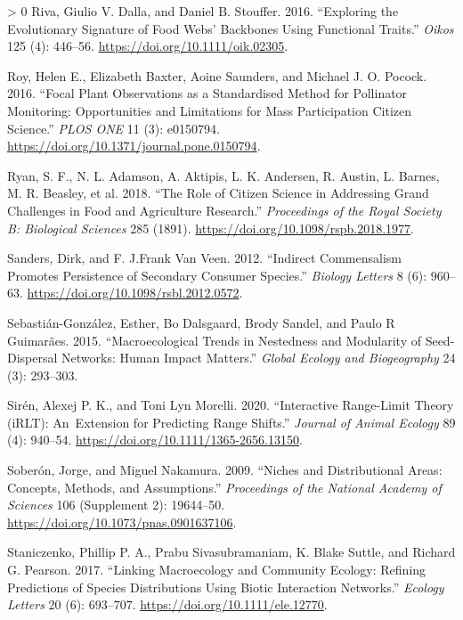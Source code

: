 \documentclass[12pt]{article}
\newlength{\cslhangindent}
\newenvironment{CSLReferences}[3] %
 {%
  \setlength{\parindent}{0pt}
  \ifodd #1 \everypar{\setlength{\hangindent}{\cslhangindent}}\ignorespaces\fi
  \ifnum #2 > 0
  \setlength{\parskip}{#2\baselineskip}
  \fi
 }%
 {}
\begin{document}
\begin{CSLReferences}{1}{0}
\leavevmode\hypertarget{ref-Riva2016ExpEvo}{}%
Riva, Giulio V. Dalla, and Daniel B. Stouffer. 2016. {``Exploring the
Evolutionary Signature of Food Webs' Backbones Using Functional
Traits.''} \emph{Oikos} 125 (4): 446--56.
\url{https://doi.org/10.1111/oik.02305}.

\leavevmode\hypertarget{ref-Roy2016FocPla}{}%
Roy, Helen E., Elizabeth Baxter, Aoine Saunders, and Michael J. O.
Pocock. 2016. {``Focal Plant Observations as a Standardised Method for
Pollinator Monitoring: Opportunities and Limitations for Mass
Participation Citizen Science.''} \emph{PLOS ONE} 11 (3): e0150794.
\url{https://doi.org/10.1371/journal.pone.0150794}.

\leavevmode\hypertarget{ref-Ryan2018RolCit}{}%
Ryan, S. F., N. L. Adamson, A. Aktipis, L. K. Andersen, R. Austin, L.
Barnes, M. R. Beasley, et al. 2018. {``The Role of Citizen Science in
Addressing Grand Challenges in Food and Agriculture Research.''}
\emph{Proceedings of the Royal Society B: Biological Sciences} 285
(1891). \url{https://doi.org/10.1098/rspb.2018.1977}.

\leavevmode\hypertarget{ref-Sanders2012IndCom}{}%
Sanders, Dirk, and F. J.Frank Van Veen. 2012. {``Indirect Commensalism
Promotes Persistence of Secondary Consumer Species.''} \emph{Biology
Letters} 8 (6): 960--63. \url{https://doi.org/10.1098/rsbl.2012.0572}.

\leavevmode\hypertarget{ref-Sebastian-Gonzalez2015MacTre}{}%
Sebastián-González, Esther, Bo Dalsgaard, Brody Sandel, and Paulo R
Guimarães. 2015. {``Macroecological Trends in Nestedness and Modularity
of Seed-Dispersal Networks: Human Impact Matters.''} \emph{Global
Ecology and Biogeography} 24 (3): 293--303.

\leavevmode\hypertarget{ref-Siren2020IntRan}{}%
Sirén, Alexej P. K., and Toni Lyn Morelli. 2020. {``Interactive
Range-Limit Theory (iRLT): An~Extension for Predicting Range Shifts.''}
\emph{Journal of Animal Ecology} 89 (4): 940--54.
\url{https://doi.org/10.1111/1365-2656.13150}.

\leavevmode\hypertarget{ref-Soberon2009NicDis}{}%
Soberón, Jorge, and Miguel Nakamura. 2009. {``Niches and Distributional
Areas: Concepts, Methods, and Assumptions.''} \emph{Proceedings of the
National Academy of Sciences} 106 (Supplement 2): 19644--50.
\url{https://doi.org/10.1073/pnas.0901637106}.

\leavevmode\hypertarget{ref-Staniczenko2017LinMac}{}%
Staniczenko, Phillip P. A., Prabu Sivasubramaniam, K. Blake Suttle, and
Richard G. Pearson. 2017. {``Linking Macroecology and Community Ecology:
Refining Predictions of Species Distributions Using Biotic Interaction
Networks.''} \emph{Ecology Letters} 20 (6): 693--707.
\url{https://doi.org/10.1111/ele.12770}.


\end{CSLReferences}
\end{document}

